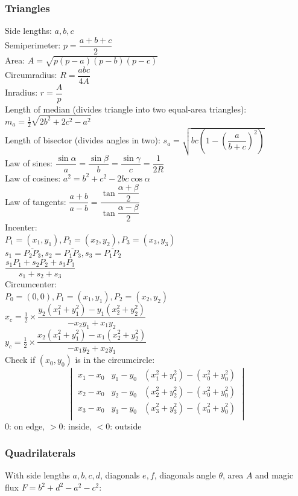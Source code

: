 \subsubsection{Triangles}
Side lengths: $a,b,c$\\
Semiperimeter: $p=\dfrac{a+b+c}{2}$\\
Area: $A=\sqrt{p(p-a)(p-b)(p-c)}$\\
Circumradius: $R=\dfrac{abc}{4A}$\\
Inradius: $r=\dfrac{A}{p}$\\
Length of median (divides triangle into two equal-area triangles): $m_a=\tfrac{1}{2}\sqrt{2b^2+2c^2-a^2}$\\
Length of bisector (divides angles in two): $s_a=\sqrt{bc\left(1-\left(\dfrac{a}{b+c}\right)^2\right)}$\\
Law of sines: $\dfrac{\sin\alpha}{a}=\dfrac{\sin\beta}{b}=\dfrac{\sin\gamma}{c}=\dfrac{1}{2R}$\\
Law of cosines: $a^2=b^2+c^2-2bc\cos\alpha$\\
Law of tangents: $\dfrac{a+b}{a-b}=\dfrac{\tan\dfrac{\alpha+\beta}{2}}{\tan\dfrac{\alpha-\beta}{2}}$\\
Incenter:\\
$P_1=(x_1,y_1),P_2=(x_2,y_2),P_3=(x_3,y_3)$\\
$s_1=\overline{P_2P_3}, s_2=\overline{P_1P_3}, s_3=\overline{P_1P_2}$ \\
$\dfrac{s_1P_1 + s_2P_2 + s_3P_3}{s_1+s_2+s_3}$\\
Circumcenter:\\
$P_0=(0,0),P_1=(x_1,y_1),P_2=(x_2,y_2)$\\
$x_c=\frac{1}{2} \times \dfrac{y_2(x_1^2+y_1^2)-y_1(x_2^2+y_2^2)}{-x_2y_1+x_1y_2}$\\
$y_c=\frac{1}{2} \times \dfrac{x_2(x_1^2+y_1^2)-x_1(x_2^2+y_2^2)}{-x_1y_2+x_2y_1}$\\
Check if $(x_0,y_0)$ is in the circumcircle:\\
\[\begin{vmatrix}
x_1-x_0 & y_1-y_0 & (x_1^2+y_1^2)-(x_0^2+y_0^2) \\
x_2-x_0 & y_2-y_0 & (x_2^2+y_2^2)-(x_0^2+y_0^2) \\
x_3-x_0 & y_3-y_0 & (x_3^2+y_3^2)-(x_0^2+y_0^2) \\
\end{vmatrix}\]
$0$: on edge, $>0$: inside, $<0$: outside\\

\subsubsection{Quadrilaterals}
With side lengths $a,b,c,d$, diagonals $e, f$, diagonals angle $\theta$, area $A$ and
magic flux $F=b^2+d^2-a^2-c^2$:

